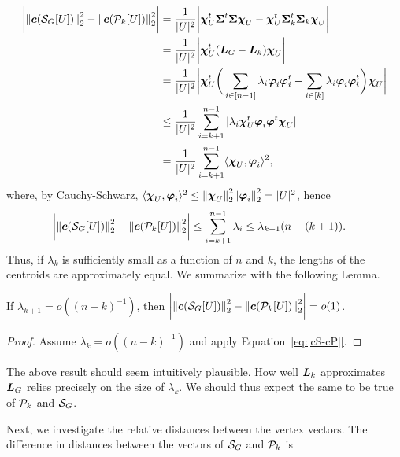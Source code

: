 \begin{align*}
\bigg|\norm{\cent(\splx_G[U])}_2^2 - \norm{\cent(\P_k[U])}_2^2\bigg| &= \frac{1}{|U|^2}\bigg| \bchi_U^\tp \Sv^\tp\Sv\bchi_U - \bchi_U^\tp \Sv_k^\tp\Sv_k\bchi_U \bigg| \\
&= \frac{1}{|U|^2} \bigg|\bchi_U^\tp (\L_G-\L_k)\bchi_U\bigg| \\
&=  \frac{1}{|U|^2} \bigg|\bchi_U^\tp \bigg( \sum_{i\in[n-1]}\lambda_i\vp_i\vp_i^\tp - \sum_{i\in[k]}\lambda_i\vp_i\vp_i^\tp\bigg)\bchi_U\bigg|\\
&\leq  \frac{1}{|U|^2} \sum_{i=k+1}^{n-1}|\lambda_i \bchi_U^\tp \vp_i\vp^\tp\bchi_U |\\
&=   \frac{1}{|U|^2} \sum_{i=k+1}^{n-1}\la \bchi_U,\vp_i\ra^2,
\end{align*}
where, by Cauchy-Schwarz, $\la \bchi_U,\vp_i\ra^2 \leq \norm{\bchi_U}_2^2 \norm{\vp_i}_2^2 = |U|^2$, 
hence  
\begin{align}
\bigg|\norm{\cent(\splx_G[U])}_2^2 - \norm{\cent(\P_k[U])}_2^2\bigg| &\leq \sum_{i=k+1}^{n-1}  \lambda_i  \leq \lambda_{k+1} (n-(k+1)). \label{eq:|cS-cP|}
\end{align}
Thus, if $\lambda_k$ is sufficiently small as a function  of $n$ and $k$, the lengths of the centroids are approximately equal. We summarize with  the following Lemma. 

\begin{lemma}
	If $\lambda_{k+1} = o((n-k)^{-1})$, then  $ \bigg|\norm{\cent(\splx_G[U])}_2^2 - \norm{\cent(\P_k[U])}_2^2\bigg| = o(1)$. 
\end{lemma}
\begin{proof}
	Assume $\lambda_k = o((n-k)^{-1})$ and apply Equation~\eqref{eq:|cS-cP|}. 
\end{proof}

\begin{remark}
	The  above result should seem intuitively plausible.  How  well $\L_k$ approximates $\L_G$ relies precisely on the size of $\lambda_k$. We should  thus expect  the same to be  true  of $\P_k$ and  $\splx_G$. 
\end{remark}

Next, we  investigate the relative distances between  the vertex vectors. The difference  in distances  between the vectors of $\splx_G$ and $\P_k$ is 

